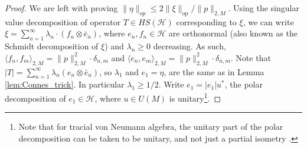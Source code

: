\documentclass[11pt]{amsart}
\DeclareMathOperator{\op}{op}
\newcommand{\R}{{\mathbb{R}}}
\newcommand{\cH}{{\mathcal{H}}}
\theoremstyle{definition}
\theoremstyle{remark}
\theoremstyle{definition}
\newcommand{\iti}[1]{{\begingroup\color{blue}Itamar: #1\endgroup}}
\begin{document}
\begin{proof}
    We are left with proving $\| \eta \|_{op} \leq 2 \| \xi\|_{\op} / \| p \|_{2,M}$.
    Using the singular value decomposition of operator $T \in HS(\cH)$ corresponding to $\xi$, we can write $\xi = \sum_{n=1}^\infty \lambda_n\cdot  (f_n \otimes \bar e_n)$, where $e_n, f_n \in \cH$ are orthonormal (also known as the Schmidt decomposition of $\xi$) and $\lambda_n \geq 0$ decreasing. As such, $\langle f_n, f_m\rangle_{2,M} = \| p\|_{2,M}^2\cdot \delta_{n,m}$ and $\langle e_n, e_m\rangle_{2,M} = \| p\|_{2,M}^2\cdot \delta_{n,m}$.
    Note that $|T| = \sum_{n=1}^\infty \lambda_n(e_n\otimes \bar e_n)$, so $\lambda_1$  and  $e_1 = \eta$, are the same as in Lemma \ref{lem:Connes_trick}. 
    In particular  $\lambda_1 \geq  1/2$.
    Write $e_1=  | e_1| u^*$, the polar decomposition of $e_1 \in \cH$, where $u \in U(M)$ is unitary\footnote{Note that for tracial von Neumann algebra, the unitary part of the polar decomposition can be taken to be unitary, and not just a partial isometry \cite{943650}.}.

\end{proof}
\end{document}

